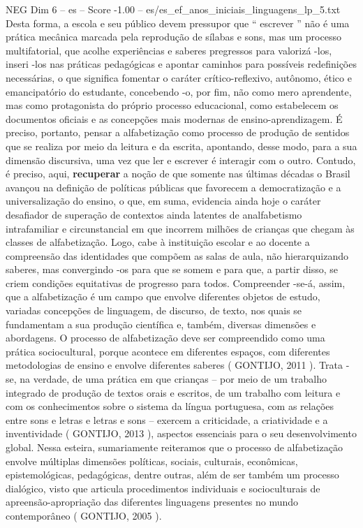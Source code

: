 \begin{textsample}{NEG Dim 6 – es – Score -1.00 – es/es\_ef\_anos\_iniciais\_linguagens\_lp\_5.txt}
Desta forma, a escola e seu público devem pressupor que “ escrever ” não é uma prática mecânica marcada pela reprodução de sílabas e sons, mas um processo multifatorial, que acolhe experiências e saberes pregressos para valorizá -los, inseri -los nas práticas pedagógicas e apontar caminhos para possíveis redefinições necessárias, o que significa fomentar o caráter crítico-reflexivo, autônomo, ético e emancipatório do estudante, concebendo -o, por fim, não como mero aprendente, mas como protagonista do próprio processo educacional, como estabelecem os documentos oficiais e as concepções mais modernas de ensino-aprendizagem.
É preciso, portanto, pensar a alfabetização como processo de produção de sentidos que se realiza por meio da leitura e da escrita, apontando, desse modo, para a sua dimensão discursiva, uma vez que ler e escrever é interagir com o outro.
Contudo, é preciso, aqui, \textbf{recuperar} a noção de que somente nas últimas décadas o Brasil avançou na definição de políticas públicas que favorecem a democratização e a universalização do ensino, o que, em suma, evidencia ainda hoje o caráter desafiador de superação de contextos ainda latentes de analfabetismo intrafamiliar e circunstancial em que incorrem milhões de crianças que chegam às classes de alfabetização.
Logo, cabe à instituição escolar e ao docente a compreensão das identidades que compõem as salas de aula, não hierarquizando saberes, mas convergindo -os para que se somem e para que, a partir disso, se criem condições equitativas de progresso para todos.
Compreender -se-á, assim, que a alfabetização é um campo que envolve diferentes objetos de estudo, variadas concepções de linguagem, de discurso, de texto, nos quais se fundamentam a sua produção científica e, também, diversas dimensões e abordagens.
O processo de alfabetização deve ser compreendido como uma prática sociocultural, porque acontece em diferentes espaços, com diferentes metodologias de ensino e envolve diferentes saberes ( GONTIJO, 2011 ).
Trata -se, na verdade, de uma prática em que crianças – por meio de um trabalho integrado de produção de textos orais e escritos, de um trabalho com leitura e com os conhecimentos sobre o sistema da língua portuguesa, com as relações entre sons e letras e letras e sons – exercem a criticidade, a criatividade e a inventividade ( GONTIJO, 2013 ), aspectos essenciais para o seu desenvolvimento global.
Nessa esteira, sumariamente reiteramos que o processo de alfabetização envolve múltiplas dimensões políticas, sociais, culturais, econômicas, epistemológicas, pedagógicas, dentre outras, além de ser também um processo dialógico, visto que articula procedimentos individuais e socioculturais de apreensão-apropriação das diferentes linguagens presentes no mundo contemporâneo ( GONTIJO, 2005 ).

\end{textsample}
